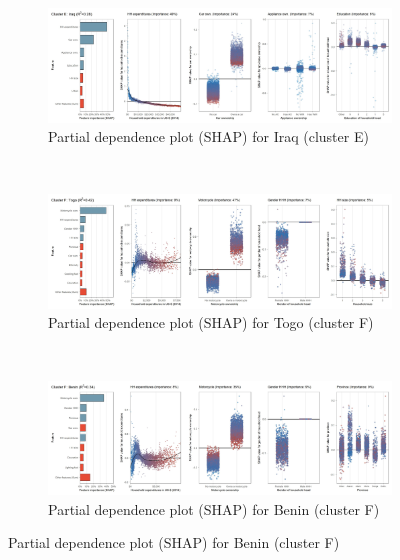 \begin{figure}[ht!]\ContinuedFloat
    \centering
   \begin{subfigure}[b]{\textwidth}
         \centering
         \caption{Partial dependence plot (SHAP) for Iraq (cluster E)}
         \label{fig:5b_IRQ}
         \includegraphics[width=\textwidth]{Figure 5b/Figure_5b_IRQ}         
     \end{subfigure}
    \\
    \vspace{0.5cm}
   \begin{subfigure}[b]{\textwidth}
         \centering
         \caption{Partial dependence plot (SHAP) for Togo (cluster F)}
         \label{fig:5b_TGO}
         \includegraphics[width=\textwidth]{Figure 5b/Figure_5b_TGO}         
     \end{subfigure}
    \\
    \vspace{0.5cm}
   \begin{subfigure}[b]{\textwidth}
         \centering
         \caption{Partial dependence plot (SHAP) for Benin (cluster F)}
         \label{fig:5b_BEN}
         \includegraphics[width=\textwidth]{Figure 5b/Figure_5b_BEN}

\end{subfigure}
\end{figure}
